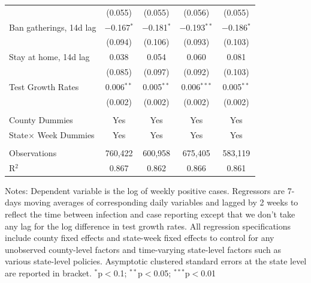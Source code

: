 \documentclass[9pt,twoside,lineno]{pnas-new}
\theoremstyle{definition}
\begin{document}
\begin{table}[!htbp]
{\begin{tabular}{@{\extracolsep{1pt}}lcc|cc}
  & (0.055) & (0.055) & (0.056) & (0.055) \\ 
 Ban gatherings, 14d  lag  & $-$0.167$^{*}$ & $-$0.181$^{*}$ & $-$0.193$^{**}$ & $-$0.186$^{*}$ \\ 
  & (0.094) & (0.106) & (0.093) & (0.103) \\ 
Stay at home, 14d  lag& 0.038 & 0.054 & 0.060 & 0.081 \\ 
  & (0.085) & (0.097) & (0.092) & (0.103) \\  
  Test Growth Rates & 0.006$^{**}$ & 0.005$^{**}$ & 0.006$^{***}$ & 0.005$^{**}$ \\ 
  & (0.002) & (0.002) & (0.002) & (0.002) \\ 
 \hline \\[-1.8ex]  
County Dummies & Yes & Yes &  Yes  &  Yes  \\
State$\times$ Week Dummies&Yes & Yes &  Yes  &  Yes  \\
\hline \\[-1.8ex] 
Observations & 760,422 & 600,958 & 675,405 & 583,119 \\ 
R$^{2}$ & 0.867 & 0.862 & 0.866 & 0.861 \\   \hline
\hline %
\end{tabular}}
\vspace{-0.2cm}  {\scriptsize
\begin{flushleft}
Notes: Dependent variable is the log of weekly positive cases. Regressors are 7-days moving averages of corresponding daily variables  and lagged by 2 weeks to reflect the time between infection and case reporting except that we don't take any lag for the log difference in test growth rates.  All regression specifications include county fixed effects and state-week fixed effects to control for any unobserved county-level factors and time-varying state-level factors such as  various state-level policies.
Asymptotic clustered standard errors at the state level are reported in bracket.   {$^{*}$p$<$0.1; $^{**}$p$<$0.05; $^{***}$p$<$0.01}
\end{flushleft}}
\end{table}
 
\end{document}
